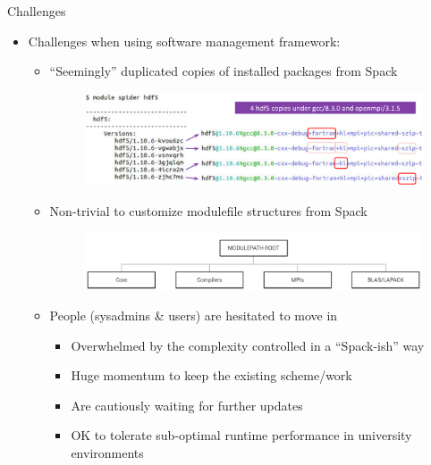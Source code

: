 \documentclass[final]{beamer}
\newlength{\onecolwid}
\begin{document}
\begin{frame}[t]
\begin{columns}[t]
\begin{column}{\onecolwid}
\begin{block}{Challenges}
\begin{itemize}
    \vspace{-1em}
    \item Challenges when using software management framework:
        \begin{itemize}
            \item ``Seemingly'' duplicated copies of installed packages from Spack 
                \begin{figure}[htbp]
                  \centerline{\includegraphics[width=0.85\linewidth]{figures/dup_pkgs.pdf}}
                  \label{fig:dup_pkgs}
                \end{figure}
            \vspace{-1.2em}
            \item Non-trivial to customize modulefile structures from Spack
                \begin{figure}[htbp]
                  \centerline{\includegraphics[width=0.85\linewidth]{figures/default_hiermod.pdf}}
                  \label{fig:default_hiermod}
                \end{figure}
            \vspace{-0.5em}
            \item People (sysadmins \& users) are hesitated to move in
                \begin{itemize}
                    \item Overwhelmed by the complexity controlled in a ``Spack-ish'' way
                    \item Huge momentum to keep the existing scheme/work
                    \item Are cautiously waiting for further updates
                    \item OK to tolerate sub-optimal runtime performance in university environments
                \end{itemize}
        \end{itemize}
\end{itemize}



\end{block}
\end{column}
\end{columns}
\end{frame}
\end{document}
